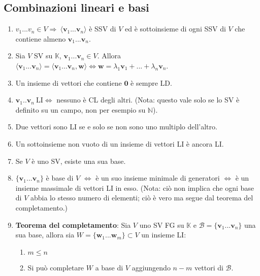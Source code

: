 \documentclass[draft]{article}
\newcommand{\bl}[1]{\mathbf{#1}}
\newcommand{\vv}{\mathbf{v}}
\newcommand{\vw}{\mathbf{w}}
\begin{document}
\subsection{Combinazioni lineari e basi}
\begin{enumerate}

\item $v_1 ... v_n \in V \Rightarrow \ \langle \vv _1 ... \vv _n \rangle $ è SSV di $V$ ed è sottoinsieme di ogni SSV di $V$ che contiene almeno $\vv _1 ... \vv _n$.

\item Sia $V$ SV su $\mathbb{K}$, $\vv _1 ... \vv _n \in V$. Allora $\langle \vv _1 ... \vv _n \rangle =\langle \vv _1 ... \vv _n , \vw \rangle  \Leftrightarrow \vw = \lambda _1 \vv _1 + ... + \lambda _n \vv _n$.

\item Un insieme di vettori che contiene $\bl{0}$ è sempre LD.

\item $\vv _1 .. \vv _n \ \mathrm{LI} \Leftrightarrow$ nessuno è CL degli altri. (Nota: questo vale solo se lo SV è definito su un campo, non per esempio su $\mathbb{N}$).

\item Due vettori sono LI se e solo se non sono uno multiplo dell'altro.

\item Un sottoinsieme non vuoto di un insieme di vettori LI è ancora LI.

\item Se $V$ è uno SV, esiste una sua base.

\item $\{ \vv _1 ... \vv _n \}$ è base di $V$ $\Leftrightarrow$ è un suo insieme minimale di generatori $\Leftrightarrow$ è un insieme massimale di vettori LI in esso. (Nota: ciò non implica che ogni base di $V$ abbia lo stesso numero di elementi; ciò è vero ma segue dal teorema del completamento.)

\item \textbf{Teorema del completamento}: Sia $V$ uno SV FG su $\mathbb{K}$ e $\mathcal{B} = \{ \vv _1 ... \vv _n \}$ una sua base, allora sia $W= \{ \vw _1 ... \vw _m \} \subset V$ un insieme LI:
\begin{enumerate}
\item $m \leq n$
\item Si può completare $W$ a base di $V$ aggiungendo $n-m$ vettori di $\mathcal{B}$.
\end{enumerate}


\end{enumerate}
\end{document}
